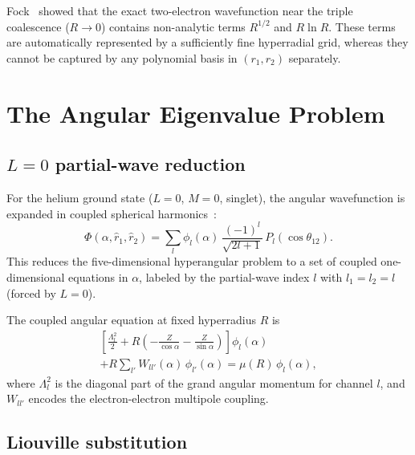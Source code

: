 \documentclass[aps,pra,twocolumn,superscriptaddress,longbibliography]{revtex4-2}
\begin{document}
Fock~\cite{Fock1954} showed that the exact two-electron wavefunction
near the triple coalescence ($R \to 0$) contains non-analytic terms
$R^{1/2}$ and $R\ln R$.  These terms are automatically represented
by a sufficiently fine hyperradial grid, whereas they cannot be
captured by any polynomial basis in $(r_1, r_2)$ separately.


\section{The Angular Eigenvalue Problem}
\label{sec:angular}

\subsection{$L=0$ partial-wave reduction}

For the helium ground state ($L=0$, $M=0$, singlet), the angular
wavefunction is expanded in coupled spherical
harmonics~\cite{Lin1995}:
\begin{equation}
  \Phi(\alpha, \hat{r}_1, \hat{r}_2)
  = \sum_l \phi_l(\alpha)\,
  \frac{(-1)^l}{\sqrt{2l+1}}\,P_l(\cos\theta_{12}).
  \label{eq:pw_expansion}
\end{equation}
This reduces the five-dimensional hyperangular problem to a set of
coupled one-dimensional equations in $\alpha$, labeled by the
partial-wave index $l$ with $l_1 = l_2 = l$ (forced by $L = 0$).

The coupled angular equation at fixed hyperradius $R$
is~\cite{Macek1968}
\begin{multline}
  \left[\frac{\Lambda^2_l}{2}
  + R\!\left(-\frac{Z}{\cos\alpha} - \frac{Z}{\sin\alpha}\right)
  \right]\!\phi_l(\alpha) \\
  + R\sum_{l'} W_{ll'}(\alpha)\,\phi_{l'}(\alpha)
  = \mu(R)\,\phi_l(\alpha),
  \label{eq:angular_eq}
\end{multline}
where $\Lambda^2_l$ is the diagonal part of the grand angular
momentum for channel $l$, and $W_{ll'}$ encodes the electron-electron
multipole coupling.

\subsection{Liouville substitution}
\end{document}
